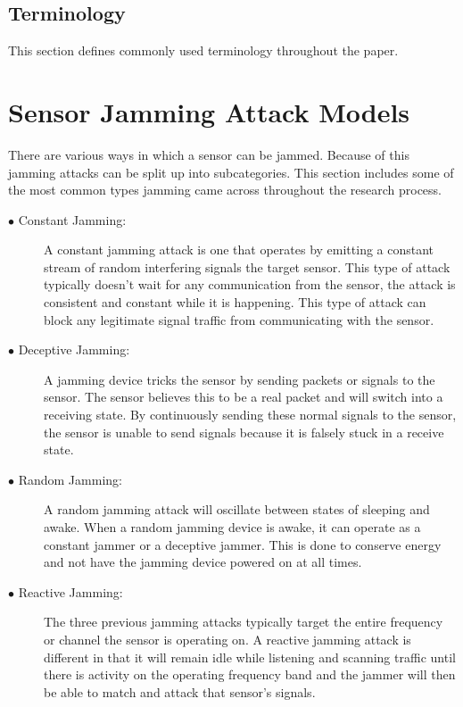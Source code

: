\documentclass[conference]{IEEEtran}
\begin{document}
\subsection{Terminology}
This section defines commonly used terminology throughout the paper.\\

\section{Sensor Jamming Attack Models}
There are various ways in which a sensor can be jammed. Because of this jamming attacks can be split up into subcategories. This section includes some of the most common types jamming came across throughout the research process.\\
\begin{description}

  \item[$\bullet$ Constant Jamming:] A constant jamming attack is one that operates by emitting a constant stream of random interfering signals the target sensor. This type of attack typically doesn't wait for any communication from the sensor, the attack is consistent and constant while it is happening. This type of attack can block any legitimate signal traffic from communicating with the sensor\cite{5}.\\
   \item[$\bullet$ Deceptive Jamming:] A jamming device tricks the sensor by sending packets or signals to the sensor. The sensor believes this to be a real packet and will switch into a receiving state. By continuously sending these normal signals to the sensor, the sensor is unable to send signals because it is falsely stuck in a receive state\cite{5}.\\
    \item[$\bullet$ Random Jamming:]  A random jamming attack will oscillate between states of sleeping and awake. When a random jamming device is awake, it can operate as a constant jammer or a deceptive jammer. This is done to conserve energy and not have the jamming device powered on at all times\cite{5}. \\
     \item[$\bullet$ Reactive Jamming:] The three previous jamming attacks typically target the entire frequency or channel the sensor is operating on. A reactive jamming attack is different in that it will remain idle while listening and scanning traffic until there is activity on the operating frequency band and the jammer will then be able to match and attack that sensor's signals\cite{2}\cite{5}.\\

\end{description}
\end{document}
